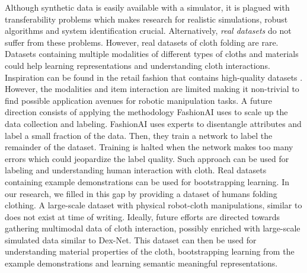 \documentclass[\home/main.tex]{subfiles}
\begin{document}
Although synthetic data is easily available with a simulator, it is plagued with transferability problems which makes research for realistic simulations, robust algorithms and system identification crucial. Alternatively, \emph{real datasets} do not suffer from these problems. However, real datasets of cloth folding are rare. Datasets containing multiple modalities of different types of cloths and materials could help learning representations and understanding cloth interactions. Inspiration can be found in the retail fashion that contains high-quality datasets \autocite{DeepFashion, DeepFashion2, FashionAI}. However, the modalities and item interaction are limited making it non-trivial to find possible application avenues for robotic manipulation tasks. A future direction consists of applying the methodology FashionAI \autocite{FashionAI} uses to scale up the data collection and labeling. FashionAI uses experts to disentangle attributes and label a small fraction of the data. Then, they train a network to label the remainder of the dataset. Training is halted when the network makes too many errors which could jeopardize the label quality. Such approach can be used for labeling and understanding human interaction with cloth. 
Real datasets containing example demonstrations can be used for bootstrapping learning. In our research, we filled in this gap by providing a dataset of humans folding clothing. A large-scale dataset with physical robot-cloth manipulations, similar to \autocite{Levine2016} does not exist at time of writing. Ideally, future efforts are directed towards gathering multimodal data of cloth interaction, possibly enriched with large-scale simulated data similar to Dex-Net. This dataset can then be used for understanding material properties of the cloth, bootstrapping learning from the example demonstrations and learning semantic meaningful representations.
\end{document}
